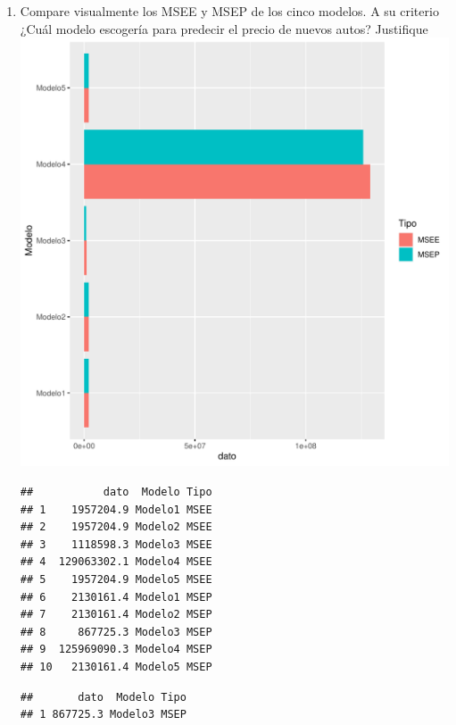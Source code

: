 \documentclass[11pt,letterpaper]{article}\usepackage[]{graphicx}\usepackage[]{color}
\makeatletter
\def\maxwidth{ %
  \ifdim\Gin@nat@width>\linewidth
    \linewidth
  \else
    \Gin@nat@width
  \fi
}
\newenvironment{kframe}{%
 \def\at@end@of@kframe{}%
 \ifinner\ifhmode%
  \def\at@end@of@kframe{\end{minipage}}%
  \begin{minipage}{\columnwidth}%
 \fi\fi%
 \def\FrameCommand##1{\hskip\@totalleftmargin \hskip-\fboxsep
 \colorbox{shadecolor}{##1}\hskip-\fboxsep
     \hskip-\linewidth \hskip-\@totalleftmargin \hskip\columnwidth}%
 \MakeFramed {\advance\hsize-\width
   \@totalleftmargin\z@ \linewidth\hsize
   \@setminipage}}%
 {\par\unskip\endMakeFramed%
 \at@end@of@kframe}
\newenvironment{knitrout}{}{} %
\makeatother
\begin{document}
\begin{enumerate}
    \item Compare visualmente los MSEE y MSEP de los cinco modelos. A su criterio ¿Cuál modelo escogería para predecir el precio de nuevos autos? Justifique
\begin{knitrout}
\color{fgcolor}
\includegraphics[width=\maxwidth]{figure/unnamed-chunk-15-1} 
\begin{kframe}\begin{verbatim}
##           dato  Modelo Tipo
## 1    1957204.9 Modelo1 MSEE
## 2    1957204.9 Modelo2 MSEE
## 3    1118598.3 Modelo3 MSEE
## 4  129063302.1 Modelo4 MSEE
## 5    1957204.9 Modelo5 MSEE
## 6    2130161.4 Modelo1 MSEP
## 7    2130161.4 Modelo2 MSEP
## 8     867725.3 Modelo3 MSEP
## 9  125969090.3 Modelo4 MSEP
## 10   2130161.4 Modelo5 MSEP
\end{verbatim}
\end{kframe}
\end{knitrout}
 
\begin{knitrout}
\color{fgcolor}\begin{kframe}
\begin{verbatim}
##       dato  Modelo Tipo
## 1 867725.3 Modelo3 MSEP
\end{verbatim}
\end{kframe}
\end{knitrout}
  

\end{enumerate}
\end{document}
